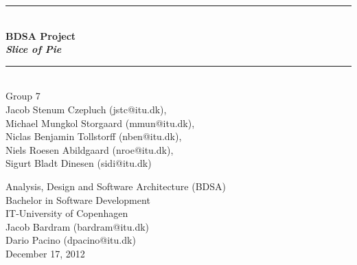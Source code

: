 \documentclass[a4paper,11pt]{article}
\begin{document}
\begin{titlepage}
\centering \parindent=0pt
\newcommand{\HRule}{\rule{\textwidth}{1mm}}
 \HRule\\[1cm]\Huge\bfseries
BDSA Project\\\emph{Slice of Pie}\\[0.7cm]
\HRule\\[4cm]  \large Group 7
\\Jacob Stenum Czepluch (jstc@itu.dk), 
\\Michael Mungkol Storgaard (mmun@itu.dk),
\\Niclas Benjamin Tollstorff (nben@itu.dk), 
\\Niels Roesen Abildgaard (nroe@itu.dk), 
\\Sigurt Bladt Dinesen (sidi@itu.dk) \\

 \normalsize %
\thispagestyle{empty}
\begin{flushleft}
Analysis, Design and Software Architecture (BDSA)\\
Bachelor in Software Development\\
IT-University of Copenhagen\\
Jacob Bardram (bardram@itu.dk)\\
Dario Pacino (dpacino@itu.dk) \\
December 17, 2012 \end{flushleft}
\end{titlepage}

\tableofcontents
\pagebreak

\pagebreak
\setcounter{page}{4}


\pagebreak


\pagebreak


\pagebreak


\pagebreak


\pagebreak


\pagebreak


\pagebreak


\pagebreak


\pagebreak
\appendix

\end{document}
